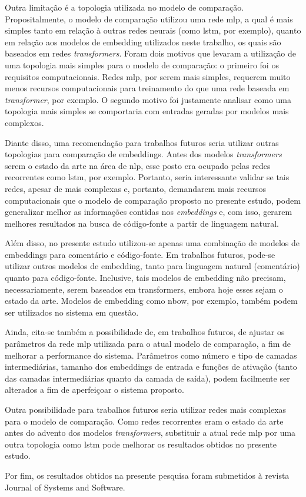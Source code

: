 Outra limitação é a topologia utilizada no modelo de comparação. Propositalmente, o modelo de comparação utilizou uma rede \gls{mlp}, a qual é mais simples tanto em relação à outras redes neurais (como \gls{lstm}, por exemplo), quanto em relação aos modelos de embedding utilizados neste trabalho, os quais são baseados em redes \textit{transformers}. Foram dois motivos que levaram a utilização de uma topologia mais simples para o modelo de comparação: o primeiro foi os requisitos computacionais. Redes \gls{mlp}, por serem mais simples, requerem muito menos recursos computacionais para treinamento do que uma rede baseada em \textit{transformer}, por exemplo. O segundo motivo foi justamente analisar como uma topologia mais simples se comportaria com entradas geradas por modelos mais complexos.

Diante disso, uma recomendação para trabalhos futuros seria utilizar outras topologias para comparação de embeddings. Antes dos modelos \textit{transformers} serem o estado da arte na área de \gls{nlp}, esse posto era ocupado pelas redes recorrentes como \gls{lstm}, por exemplo. Portanto, seria interessante validar se tais redes, apesar de mais complexas e, portanto, demandarem mais recursos computacionais que o modelo de comparação proposto no presente estudo, podem generalizar melhor as informações contidas nos \textit{embeddings} e, com isso, gerarem melhores resultados na busca de código-fonte a partir de linguagem natural.

Além disso, no presente estudo utilizou-se apenas uma combinação de modelos de embeddings para comentário e código-fonte. Em trabalhos futuros, pode-se utilizar outros modelos de embedding, tanto para linguagem natural (comentário) quanto para código-fonte. Inclusive, tais modelos de embedding não precisam, necessariamente, serem baseados em transformers, embora hoje esses sejam o estado da arte. Modelos de embedding como \gls{nbow}, por exemplo, também podem ser utilizados no sistema em questão.

Ainda, cita-se também a possibilidade de, em trabalhos futuros, de ajustar os parâmetros da rede \gls{mlp} utilizada para o atual modelo de comparação, a fim de melhorar a performance do sistema. Parâmetros como número e tipo de camadas intermediárias, tamanho dos embeddings de entrada e funções de ativação (tanto das camadas intermediárias quanto da camada de saída), podem facilmente ser alterados a fim de aperfeiçoar o sistema proposto.

Outra possibilidade para trabalhos futuros seria utilizar redes mais complexas para o modelo de comparação. Como redes recorrentes eram o estado da arte antes do advento dos modelos \textit{transformers}, substituir a atual rede \gls{mlp} por uma outra topologia como \gls{lstm} pode melhorar os resultados obtidos no presente estudo.

Por fim, os resultados obtidos na presente pesquisa foram submetidos à revista Journal of Systems and Software.